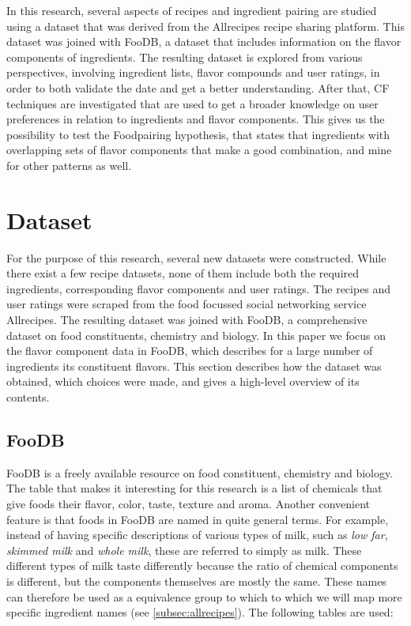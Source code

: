 In this research, several aspects of recipes and ingredient pairing are studied using a dataset that was derived from the Allrecipes recipe sharing platform.
This dataset was joined with FooDB, a dataset that includes information on the flavor components of ingredients.
The resulting dataset is explored from various perspectives, involving ingredient lists, flavor compounds and user ratings, in order to both validate the date and get a better understanding.
After that, CF techniques are investigated that are used to get a broader knowledge on user preferences in relation to ingredients and flavor components. 
This gives us the possibility to test the Foodpairing hypothesis, that states that ingredients with overlapping sets of flavor components that make a good combination, and mine for other patterns as well.




\section{Dataset}
\label{sec:dataset}

For the purpose of this research, several new datasets were constructed.
While there exist a few recipe datasets, none of them include both the required ingredients, corresponding flavor components and user ratings.
The recipes and user ratings were scraped from the food focussed social networking service Allrecipes.
The resulting dataset was joined with FooDB, a comprehensive dataset on food constituents, chemistry and biology.
In this paper we focus on the flavor component data in FooDB, which  describes for a large number of ingredients its constituent flavors.
This section describes how the dataset was obtained, which choices were made, and gives a high-level overview of its contents.




\subsection{FooDB}
\label{subsec:foodb}

FooDB is a freely available resource on food constituent, chemistry and biology.
The table that makes it interesting for this research is a list of chemicals that give foods their flavor, color, taste, texture and aroma.
Another convenient feature is that foods in FooDB are named in quite general terms.
For example, instead of having specific descriptions of various types of milk, such as \emph{low far}, \emph{skimmed milk} and \emph{whole milk}, these are referred to simply as milk.
These different types of milk taste differently because the ratio of chemical components is different, but the components themselves are mostly the same.
These names can therefore be used as a equivalence group to which to which we will map more specific ingredient names (see \cref{subsec:allrecipes}).
The following tables are used:

